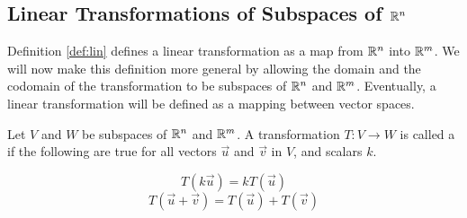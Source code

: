\documentclass{ximera}
\begin{document}
\begin{example}
\begin{explanation}
\begin{center}
\end{center}
\end{explanation}
\end{example}

\subsection*{Linear Transformations of Subspaces of $\mathbb{R}^n$}

Definition \ref{def:lin} defines a linear transformation as a map from $\mathbb{R}^n$ into $\mathbb{R}^m$.  We will now make this definition more general by allowing the domain and the codomain of the transformation to be subspaces of $\mathbb{R}^n$ and $\mathbb{R}^m$.  Eventually, a linear transformation will be defined as a mapping between vector spaces.

\begin{definition}\label{def:lin2}
Let $V$ and $W$ be subspaces of $\mathbb{R}^n$ and $\mathbb{R}^m$.  A transformation $T:V\rightarrow W$ is called a  if the following are true for all vectors $\vec{u}$ and $\vec{v}$ in $V$, and scalars $k$.

$$T(k\vec{u})= kT(\vec{u})$$
$$T(\vec{u}+\vec{v})= T(\vec{u})+T(\vec{v})$$
\end{definition}
\end{document}
